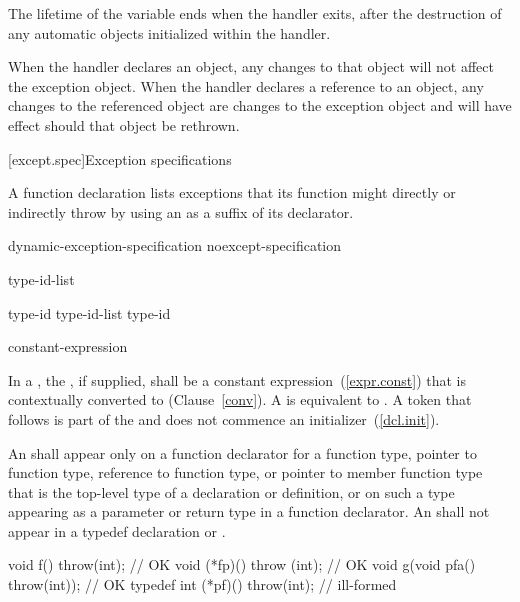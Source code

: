 The lifetime of the variable ends
when the handler exits, after the
destruction of any automatic objects initialized
within the handler.

\pnum
When the handler declares an object,
any changes to that object will not affect the exception object.
When the handler declares a reference to an object,
any changes to the referenced object are changes to the
exception object and will have effect should that object be rethrown.%
%

[except.spec]{Exception specifications}%

\pnum
A function declaration lists exceptions
that its function might directly or indirectly throw
by using an
as a suffix of its declarator.

\begin{bnf}
\br
    dynamic-exception-specification\br
    noexcept-specification
\end{bnf}

\begin{bnf}
\br
     type-id-list\opt \terminal{)}
\end{bnf}

\begin{bnf}
\br
    type-id \opt\br
    type-id-list \terminal{,} type-id \opt
\end{bnf}

\begin{bnf}
\br
     \terminal{(} constant-expression \terminal{)}\br
\end{bnf}

%
In a , the ,
if supplied, shall be a constant expression~(\ref{expr.const}) that is contextually
converted to  (Clause~\ref{conv}). A 
 is equivalent to .
A \tcode{(} token that follows  is part of the
 and does not commence an
initializer~(\ref{dcl.init}).

\pnum
An
shall appear only on a function declarator for a function type,
pointer to function type, reference to function type, or pointer to
member function type that is the top-level type of a declaration or
definition, or on such a type appearing as a parameter or return type
in a function declarator.
An
shall not appear in a typedef declaration or .
\enterexample
\begin{codeblock}
void f() throw(int);                    // OK
void (*fp)() throw (int);               // OK
void g(void pfa() throw(int));          // OK
typedef int (*pf)() throw(int);         // ill-formed
\end{codeblock}

